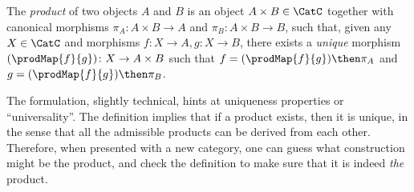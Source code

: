 \begin{shaded}
\begin{definition}
The \emph{product} of two objects $A$ and $B$ is an object $A \times B \in \CatC$ together with canonical morphisms $\pi_A \colon A \times B \to A$ and $\pi_B \colon A \times B \to B$, such that, given any $X \in \CatC$ and morphisms $f \colon X \to A, g \colon X \to B$, there exists a \emph{unique} morphism $(\prodMap{f}{g}) \colon X \to A \times B$ such that $f = (\prodMap{f}{g})\then \pi_A$ and $g=(\prodMap{f}{g})\then \pi_B$.
\end{definition}
\end{shaded}

The formulation, slightly technical, hints at uniqueness properties or ``universality''.
The definition implies that if a product exists, then it is unique, in the sense
that all the admissible products can be derived from each other. Therefore, when
presented with a new category, one can guess what construction might be the product, and check
the definition to make sure that it is indeed \emph{the} product.